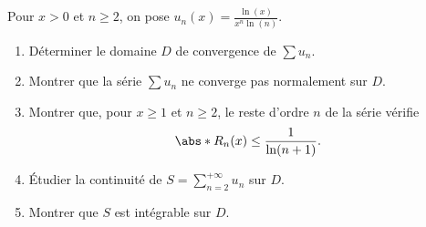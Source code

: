 \begin{enonce}
\begin{exercise}[ID={RMS135 E1549},subtitle={IMT et CCINP PSI 2024},tags={},difficulty={}]
  Pour $x>0$ et $n\geq 2$, on pose $u_n(x) = \frac{\ln(x)}{x^n \ln(n)}$.
  \begin{enumerate}
    \item Déterminer le domaine $D$ de convergence de $\sum u_n$.

    \item Montrer que la série $\sum u_n$ ne converge pas normalement sur $D$.

    \item Montrer que, pour $x\geq 1$ et $n\geq 2$, le reste d'ordre $n$ de la série vérifie
      \begin{equation*}
        \abs*{R_n(x)} \leq \frac{1}{\ln(n+1)}.
      \end{equation*}

    \item Étudier la continuité de $S = \sum\limits_{n=2}^{+\infty} u_n$ sur $D$.

    \item Montrer que $S$ est intégrable sur $D$.
  \end{enumerate}
\end{exercise}
\begin{solution}
\end{solution}
\end{enonce}
